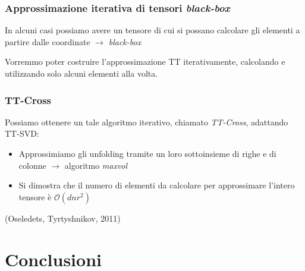 \documentclass[compress]{beamer}
\theoremstyle{definition}
\theoremstyle{plain}
\begin{document}
\begin{frame}
\frametitle{Approssimazione iterativa di tensori \emph{black-box}}
In alcuni casi possiamo avere un tensore di cui si possano calcolare gli elementi a partire dalle coordinate $\rightarrow$ \emph{black-box}

\vspace{10mm}
Vorremmo poter costruire l'approssimazione TT iterativamente, calcolando e utilizzando solo alcuni elementi alla volta.
\end{frame}

\begin{frame}
\frametitle{TT-Cross}
Possiamo ottenere un tale algoritmo iterativo, chiamato \emph{TT-Cross}, adattando TT-SVD:
\begin{itemize}
	\item Approssimiamo gli unfolding tramite un loro sottoinsieme di righe e di colonne $\rightarrow$ algoritmo \emph{maxvol}
	\item Si dimostra che il numero di elementi da calcolare per approssimare l'intero tensore è $\mathcal{O}(dnr^2)$
\end{itemize}

\vspace{5mm}
(Oseledets, Tyrtyshnikov, 2011)
\end{frame}

\section{Conclusioni}
\end{document}
